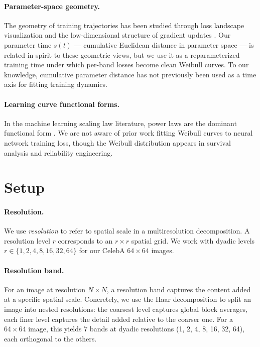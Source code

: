 \documentclass{article}
\begin{document}
\paragraph{Parameter-space geometry.}
The geometry of training trajectories has been studied through loss
landscape visualization \citep{li2018visualizing} and the low-dimensional
structure of gradient updates \citep{gurari2018gradient}. Our parameter
time $s(t)$ --- cumulative Euclidean distance in parameter space --- is
related in spirit to these geometric views, but we use it as a
reparameterized training time under which per-band losses become clean
Weibull curves. To our knowledge, cumulative parameter distance has not
previously been used as a time axis for fitting training dynamics.

\paragraph{Learning curve functional forms.}
In the machine learning scaling law literature, power laws are the dominant
functional form \citep{kaplan2020scaling,hoffmann2022training}. We are
not aware of prior work fitting Weibull curves to neural network
training loss, though the Weibull distribution appears in survival
analysis and reliability engineering.

\section{Setup}\label{setup}

\paragraph{Resolution.} We use \emph{resolution} to refer to spatial scale in a
multiresolution decomposition. A resolution level $r$ corresponds to an
$r\times r$ spatial grid. We work with dyadic levels
$r\in\{1,2,4,8,16,32,64\}$ for our CelebA $64\times 64$ images.

\paragraph{Resolution band.} For an image at resolution $N\times N$, a resolution band
captures the content added at a specific spatial scale. Concretely, we
use the Haar decomposition to split an image into nested resolutions:
the coarsest level captures global block averages, each finer level
captures the detail added relative to the coarser one. For a $64\times 64$
image, this yields 7 bands at dyadic resolutions (1, 2, 4, 8, 16, 32,
64), each orthogonal to the others.
\end{document}
